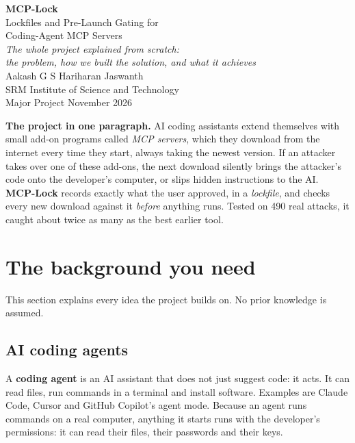 \documentclass[11pt,a4paper]{article}
\begin{document}
\begin{titlepage}
\centering
\vspace*{2.5cm}
{\Huge\bfseries\color{accent} MCP-Lock}\\[0.6em]
{\Large Lockfiles and Pre-Launch Gating for\\[0.2em] Coding-Agent MCP Servers}\\[2em]
{\large\itshape The whole project explained from scratch:\\ the problem, how we built the solution, and what it achieves}\\[3em]
{\large Aakash G S \quad\textbullet\quad Hariharan \quad\textbullet\quad Jaswanth}\\[0.6em]
{\large SRM Institute of Science and Technology}\\[0.4em]
{\normalsize Major Project \quad\textbullet\quad November 2026}
\vfill
\begin{tcolorbox}[colback=soft,colframe=accent,boxrule=0.6pt,arc=2pt,width=0.9\textwidth]
\textbf{The project in one paragraph.} AI coding assistants extend themselves with small add-on programs called
\emph{MCP servers}, which they download from the internet every time they start, always taking the newest version.
If an attacker takes over one of these add-ons, the next download silently brings the attacker's code onto the
developer's computer, or slips hidden instructions to the AI. \textbf{MCP-Lock} records exactly what the user
approved, in a \emph{lockfile}, and checks every new download against it \emph{before} anything runs. Tested on 490
real attacks, it caught about twice as many as the best earlier tool.
\end{tcolorbox}
\vspace{1cm}
\end{titlepage}

\tableofcontents
\newpage

\section{The background you need}

This section explains every idea the project builds on. No prior knowledge is assumed.

\subsection{AI coding agents}
A \textbf{coding agent} is an AI assistant that does not just suggest code: it acts. It can read files, run
commands in a terminal and install software. Examples are Claude Code, Cursor and GitHub Copilot's agent mode.
Because an agent runs commands on a real computer, anything it starts runs with the developer's permissions: it
can read their files, their passwords and their keys.
\end{document}
